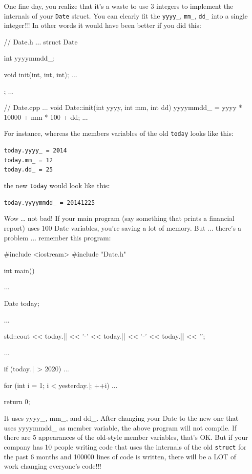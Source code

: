 One fine day, you realize that it's a waste to use 3
integers to implement the internals of your \texttt{Date} struct. You can
clearly fit the \texttt{yyyy\_}, \texttt{mm\_}, \texttt{dd\_} into a single
integer!!! In other words it would have been better if you did this:

\begin{consolethree}[escapeinside=||]
// Date.h
...
struct Date
{
    int yyyymmdd_;

    void init(int, int, int);
    ...
};
...
\end{consolethree}

\begin{consolethree}[escapeinside=||]
// Date.cpp
...
void Date::init(int yyyy, int mm, int dd)
{
    yyyymmdd_ = yyyy * 10000 + mm * 100 + dd;
}
...
\end{consolethree}

For instance, whereas the members variables of the old \texttt{today}
looks like this:
\begin{center}
\texttt{today.yyyy\_ = 2014}\\

\texttt{today.mm\_ = 12}\\

\texttt{today.dd\_ = 25}\\
\end{center}
the new \texttt{today} would look like this:

\texttt{today.yyyymmdd\_ = 20141225}

Wow … not bad! If your main program (say something that prints a
financial report) uses 100 Date variables, you're saving a lot of memory.
But ... there's a problem ... remember this program:

\begin{consolethree}[escapeinside=||]
#include <iostream>
#include "Date.h"

int main()
{
    ...

    Date today;

    ...

    std::cout << today.|| << '-'
              << today.|| << '-'
              << today.|| << '\n';

    ...
    
    if (today.|| > 2020)
    {
        ...
    }

    for (int i = 1; i < yesterday.|; ++i)
    {
        ...
    }

    return 0;
}
\end{consolethree}
It uses yyyy\_, mm\_, and dd\_. After changing your Date to the new one that uses yyyymmdd\_ as member variable, the above program will not compile. If there are 5 appearances of the old-style member variables, that's OK. But if your company has 10 people writing code that uses the internals of the old \texttt{struct} for the past 6 months and 100000 lines of code is written, there will be a LOT of work changing everyone's code!!!

